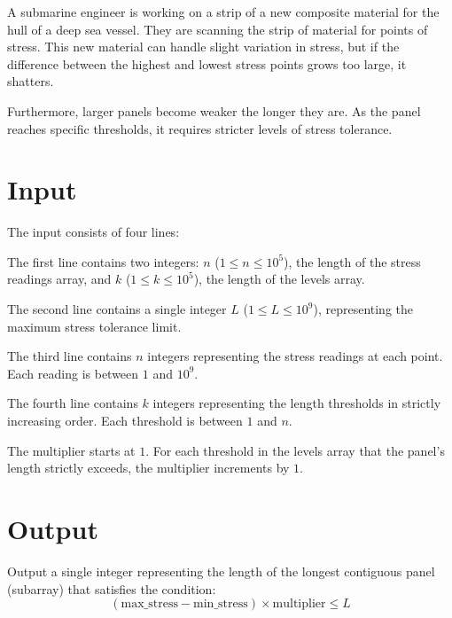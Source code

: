 
A submarine engineer is working on a strip of a new composite material for the hull of a deep sea vessel. They are scanning the strip of material for points of stress. This new material can handle slight variation in stress, but if the difference between the highest and lowest stress points grows too large, it shatters. 

Furthermore, larger panels become weaker the longer they are. As the panel reaches specific thresholds, it requires stricter levels of stress tolerance.

\section*{Input}
The input consists of four lines:

The first line contains two integers: $n$ ($1 \le n \le 10^5$), the length of the stress readings array, and $k$ ($1 \le k \le 10^5$), the length of the levels array.

The second line contains a single integer $L$ ($1 \le L \le 10^9$), representing the maximum stress tolerance limit.

The third line contains $n$ integers representing the stress readings at each point. Each reading is between $1$ and $10^9$.

The fourth line contains $k$ integers representing the length thresholds in strictly increasing order. Each threshold is between $1$ and $n$.

The multiplier starts at $1$. For each threshold in the levels array that the panel's length strictly exceeds, the multiplier increments by $1$.

\section*{Output}
Output a single integer representing the length of the longest contiguous panel (subarray) that satisfies the condition:
\[ (\text{max\_stress} - \text{min\_stress}) \times \text{multiplier} \le L \]